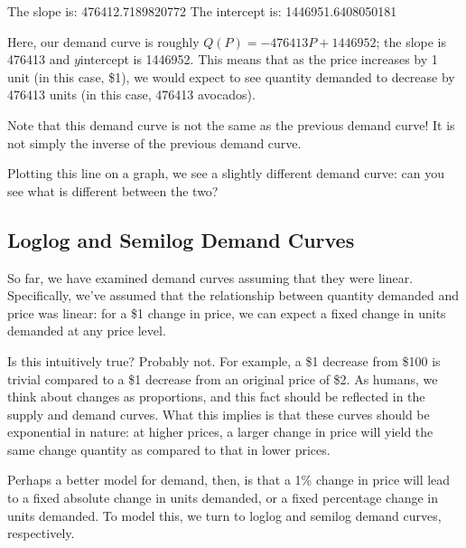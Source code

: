 \documentclass[letterpaper,10pt,english]{jupyterBook}
\begin{document}
\begin{sphinxVerbatim}[commandchars=\\\{\}]
The slope is: \PYGZhy{}476412.7189820772
The intercept is: 1446951.6408050181
\end{sphinxVerbatim}

\sphinxAtStartPar
Here, our demand curve is roughly \(Q(P) = -476413P+ 1446952\); the slope is \sphinxhyphen{}476413 and \(y\)\sphinxhyphen{}intercept is 1446952. This means that as the price increases by 1 unit (in this case, \$1), we would expect to see quantity demanded to decrease by 476413 units (in this case, 476413 avocados).

\sphinxAtStartPar
Note that this demand curve is not the same as the previous demand curve! It is not simply the inverse of the previous demand curve.

\sphinxAtStartPar
Plotting this line on a graph, we see a slightly different demand curve: can you see what is different between the two?

\noindent{}


\subsection{Log\sphinxhyphen{}log and Semi\sphinxhyphen{}log Demand Curves}
\label{\detokenize{content/01-demand/03-log-log:log-log-and-semi-log-demand-curves}}\label{\detokenize{content/01-demand/03-log-log::doc}}
\sphinxAtStartPar
So far, we have examined demand curves assuming that they were linear. Specifically, we’ve assumed that the relationship between quantity demanded and price was linear: for a \$1 change in price, we can expect a fixed change in units demanded at any price level.

\sphinxAtStartPar
Is this intuitively true? Probably not. For example, a \$1 decrease from \$100 is trivial compared to a \$1 decrease from an original price of \$2. As humans, we think about changes as proportions, and this fact should be reflected in the supply and demand curves. What this implies is that these curves should be exponential in nature: at higher prices, a larger change in price will yield the same change quantity as compared to that in lower prices.

\sphinxAtStartPar
Perhaps a better model for demand, then, is that a 1\% change in price will lead to a fixed absolute change in units demanded, or a fixed percentage change in units demanded. To model this, we turn to log\sphinxhyphen{}log and semi\sphinxhyphen{}log demand curves, respectively.
\end{document}

